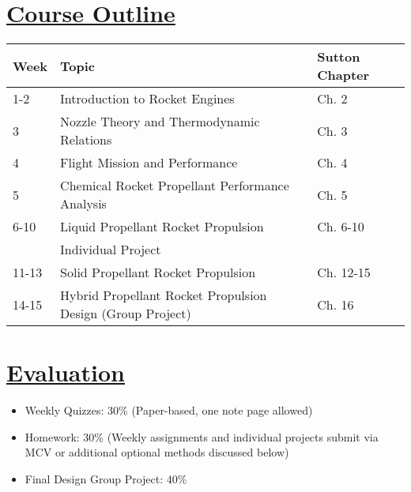 \documentclass[12pt]{article}
\begin{document}
\section{\hyperref[sec:outline]{Course Outline}}
\label{sec:outline}
\begin{tabular}{lll}
\toprule
\textbf{Week} & \textbf{Topic} & \textbf{Sutton Chapter} \\
\midrule
1-2 & Introduction to Rocket Engines & Ch. 2 \\
3 & Nozzle Theory and Thermodynamic Relations & Ch. 3 \\
4 & Flight Mission and Performance & Ch. 4 \\
5 & Chemical Rocket Propellant Performance Analysis & Ch. 5 \\
6-10 & Liquid Propellant Rocket Propulsion & Ch. 6-10 \\
    & Individual Project & \\
11-13 & Solid Propellant Rocket Propulsion & Ch. 12-15 \\
14-15 & Hybrid Propellant Rocket Propulsion Design (Group Project) & Ch. 16 \\
\bottomrule
\end{tabular}

\section{\hyperref[sec:evaluation]{Evaluation}}
\label{sec:evaluation}
\begin{itemize}
    \item Weekly Quizzes: 30\% (Paper-based, one note page allowed)
    \item Homework: 30\% (Weekly assignments and individual projects submit via MCV or additional optional methods discussed below)
    \item Final Design Group Project: 40\%
\end{itemize}
\end{document}
